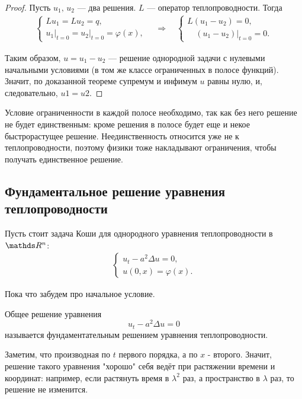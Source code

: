 \begin{proof}
Пусть $u_1, \, u_2 $ --- два решения. $L$ --- оператор теплопроводности.  Тогда
\begin{align*}
	\begin{cases*}
		Lu_1 = Lu_2 = q, \\
		u_1\Big\rvert_{t=0} = u_2\Big\rvert_{t=0} = \varphi(x),
	\end{cases*}
	\quad \Rightarrow \quad
	\begin{cases*}
		L(u_1 - u_2) = 0, \\
		\quad (u_1-u_2) \Big\rvert_{t=0}=0.
	\end{cases*}
\end{align*}

Таким образом, $u = u_1 - u_2$ --- решение однородной задачи с нулевыми начальными условиями (в том же классе ограниченных в полосе функций). Значит, по доказанной теореме супремум и инфимум $u$ равны нулю, и, следовательно, $u1 = u2$.

\end{proof}

\begin{note}
Условие ограниченности в каждой полосе необходимо, так как без него решение не будет единственным: кроме решения в полосе будет еще и некое быстрорастущее решение. Неединственность относится уже не к теплопроводности, поэтому физики тоже накладывают ограничения, чтобы получать единственное решение.
\end{note}


\subsection{Фундаментальное решение уравнения теплопроводности}
Пусть стоит задача Коши для однородного уравнения теплопроводности в $\real^n$:
\begin{align*}
	\begin{cases*}
		u_t - a^2 \Delta u = 0, \\
		u(0,x) = \varphi(x).
	\end{cases*}
\end{align*}

Пока что забудем про начальное условие.

\begin{definition} Общее решение уравнения
$$ u_t - a^2 \Delta u = 0$$
называется фундаментательным решением уравнения теплопроводности.
\end{definition}

Заметим, что производная по $t$ первого порядка, а по $x$ - второго. Значит, решение такого уравнения "хорошо" себя ведёт при растяжении времени и координат: например, если растянуть время в $\lambda^2$ раз, а пространство в $\lambda$ раз, то решение не изменится.

